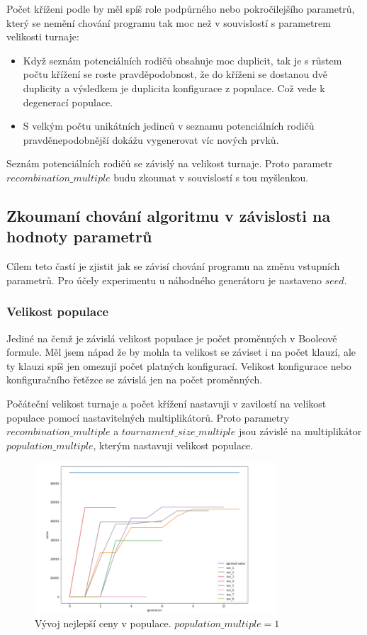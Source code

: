 \documentclass{article}
\begin{document}
Počet kříženi podle by měl spíš role podpůrného nebo pokročilejšího parametrů, který se nemění chování programu tak moc než v souvislostí s parametrem velikosti turnaje:
\begin{itemize}
\item Když seznám potenciálních rodičů obsahuje moc duplicit, tak je s růstem počtu křížení se roste pravděpodobnost, že do kříženi se dostanou dvě duplicity a výsledkem je duplicita konfigurace z populace. Což vede k degenerací populace.
\item S velkým počtu unikátních jedinců v seznamu potenciálních rodičů pravděnepodobnější dokážu vygenerovat víc nových prvků.
\end{itemize}
Seznám potenciálních rodičů se závislý na velikost turnaje. Proto parametr \(recombination\_multiple\) budu zkoumat v souvislostí s tou myšlenkou.

\subsection{Zkoumaní chování algoritmu v závislosti na hodnoty parametrů}

Cílem teto častí je zjistit jak se závisí chování programu na změnu vstupních parametrů. Pro účely experimentu u náhodného generátoru je nastaveno \(seed\).

\subsubsection{Velikost populace}

Jediné na čemž je závislá velikost populace je počet proměnných v Booleově formule. Měl jsem nápad že by mohla ta velikost se záviset i na počet klauzí, ale ty klauzi spíš jen omezují počet platných konfigurací. Velikost konfigurace nebo konfiguračního řetězce se závislá jen na počet proměnných.

Počáteční velikost turnaje a počet křížení nastavuji v zavilostí na velikost populace pomocí nastavitelných multiplikátorů. Proto parametry \(recombination\_multiple\) a \(tournament\_size\_multiple\) jsou závislé na multiplikátor \(population\_multiple\), kterým nastavuji velikost populace.

\begin{figure}[H]
    \centering
    \includegraphics[width=0.8\textwidth]{screenshot_1280}
    \caption{Vývoj nejlepší ceny v populace. \(population\_multiple = 1\)}
    \label{fig:se_pm1}
\end{figure}
\end{document}
